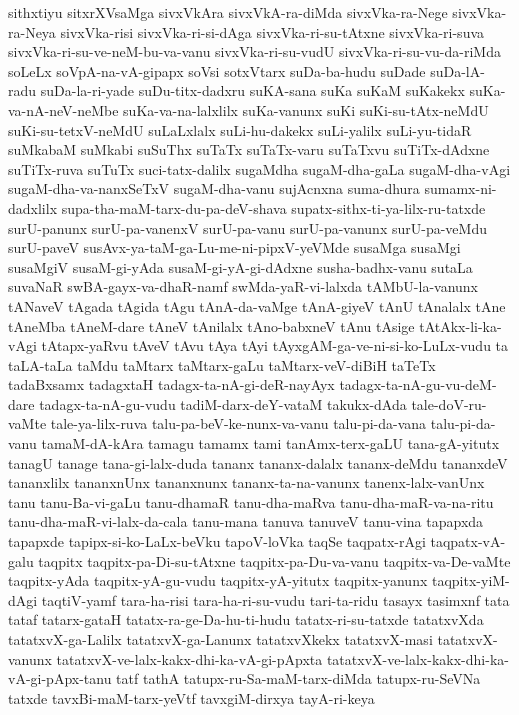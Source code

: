 {sithxtiyu
sitxrXVsaMga
sivxVkAra
sivxVkA-ra-diMda
sivxVka-ra-Nege
sivxVka-ra-Neya
sivxVka-risi
sivxVka-ri-si-dAga
sivxVka-ri-su-tAtxne
sivxVka-ri-suva
sivxVka-ri-su-ve-neM-bu-va-vanu
sivxVka-ri-su-vudU
sivxVka-ri-su-vu-da-riMda
soLeLx
soVpA-na-vA-gipapx
soVsi
sotxVtarx
suDa-ba-hudu
suDade
suDa-lA-radu
suDa-la-ri-yade
suDu-titx-dadxru
suKA-sana
suKa
suKaM
suKakekx
suKa-va-nA-neV-neMbe
suKa-va-na-lalxlilx
suKa-vanunx
suKi
suKi-su-tAtx-neMdU
suKi-su-tetxV-neMdU
suLaLxlalx
suLi-hu-dakekx
suLi-yalilx
suLi-yu-tidaR
suMkabaM
suMkabi
suSuThx
suTaTx
suTaTx-varu
suTaTxvu
suTiTx-dAdxne
suTiTx-ruva
suTuTx
suci-tatx-dalilx
sugaMdha
sugaM-dha-gaLa
sugaM-dha-vAgi
sugaM-dha-va-nanxSeTxV
sugaM-dha-vanu
sujAcnxna
suma-dhura
sumamx-ni-dadxlilx
supa-tha-maM-tarx-du-pa-deV-shava
supatx-sithx-ti-ya-lilx-ru-tatxde
surU-panunx
surU-pa-vanenxV
surU-pa-vanu
surU-pa-vanunx
surU-pa-veMdu
surU-paveV
susAvx-ya-taM-ga-Lu-me-ni-pipxV-yeVMde
susaMga
susaMgi
susaMgiV
susaM-gi-yAda
susaM-gi-yA-gi-dAdxne
susha-badhx-vanu
sutaLa
suvaNaR
swBA-gayx-va-dhaR-namf
swMda-yaR-vi-lalxda
tAMbU-la-vanunx
tANaveV
tAgada
tAgida
tAgu
tAnA-da-vaMge
tAnA-giyeV
tAnU
tAnalalx
tAne
tAneMba
tAneM-dare
tAneV
tAnilalx
tAno-babxneV
tAnu
tAsige
tAtAkx-li-ka-vAgi
tAtapx-yaRvu
tAveV
tAvu
tAya
tAyi
tAyxgAM-ga-ve-ni-si-ko-LuLx-vudu
ta
taLA-taLa
taMdu
taMtarx
taMtarx-gaLu
taMtarx-veV-diBiH
taTeTx
tadaBxsamx
tadagxtaH
tadagx-ta-nA-gi-deR-nayAyx
tadagx-ta-nA-gu-vu-deM-dare
tadagx-ta-nA-gu-vudu
tadiM-darx-deY-vataM
takukx-dAda
tale-doV-ru-vaMte
tale-ya-lilx-ruva
talu-pa-beV-ke-nunx-va-vanu
talu-pi-da-vana
talu-pi-da-vanu
tamaM-dA-kAra
tamagu
tamamx
tami
tanAmx-terx-gaLU
tana-gA-yitutx
tanagU
tanage
tana-gi-lalx-duda
tananx
tananx-dalalx
tananx-deMdu
tananxdeV
tananxlilx
tananxnUnx
tananxnunx
tananx-ta-na-vanunx
tanenx-lalx-vanUnx
tanu
tanu-Ba-vi-gaLu
tanu-dhamaR
tanu-dha-maRva
tanu-dha-maR-va-na-ritu
tanu-dha-maR-vi-lalx-da-cala
tanu-mana
tanuva
tanuveV
tanu-vina
tapapxda
tapapxde
tapipx-si-ko-LaLx-beVku
tapoV-loVka
taqSe
taqpatx-rAgi
taqpatx-vA-galu
taqpitx
taqpitx-pa-Di-su-tAtxne
taqpitx-pa-Du-va-vanu
taqpitx-va-De-vaMte
taqpitx-yAda
taqpitx-yA-gu-vudu
taqpitx-yA-yitutx
taqpitx-yanunx
taqpitx-yiM-dAgi
taqtiV-yamf
tara-ha-risi
tara-ha-ri-su-vudu
tari-ta-ridu
tasayx
tasimxnf
tata
tataf
tatarx-gataH
tatatx-ra-ge-Da-hu-ti-hudu
tatatx-ri-su-tatxde
tatatxvXda
tatatxvX-ga-Lalilx
tatatxvX-ga-Lanunx
tatatxvXkekx
tatatxvX-masi
tatatxvX-vanunx
tatatxvX-ve-lalx-kakx-dhi-ka-vA-gi-pApxta
tatatxvX-ve-lalx-kakx-dhi-ka-vA-gi-pApx-tanu
tatf
tathA
tatupx-ru-Sa-maM-tarx-diMda
tatupx-ru-SeVNa
tatxde
tavxBi-maM-tarx-yeVtf
tavxgiM-dirxya
tayA-ri-keya
}
